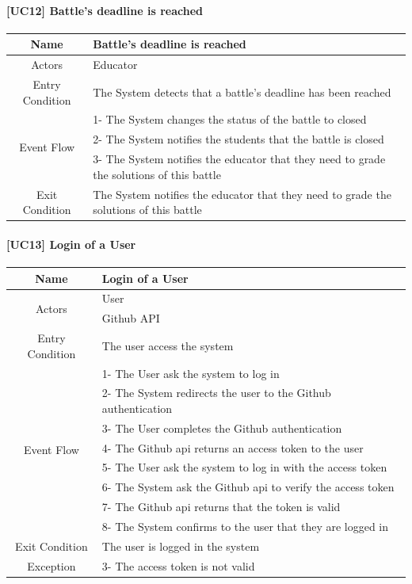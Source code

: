 \documentclass{article}
\begin{document}
\newpage
\paragraph{[UC12] Battle's deadline is reached}
\begin{center}
\begin{tabular}{|c|m{40em}|}
\hline
Name & Battle's deadline is reached\\
\hline
\multirow{1}{4em}{Actors}
& Educator\\
\hline
Entry Condition & The System detects that a battle's deadline has been reached\\
\hline
\multirow{3}{4em}{Event Flow}
&1- The System changes the status of the battle to closed\\
&2- The System notifies the students that the battle is closed\\
&3- The System notifies the educator that they need to grade the solutions of this battle\\
\hline
Exit Condition & The System notifies the educator that they need to grade the solutions of this battle\\
\hline
\end{tabular}
\end{center}

\paragraph{[UC13] Login of a User}
\begin{center}
\begin{tabular}{|c|m{40em}|}
\hline
Name & Login of a User\\
\hline
\multirow{2}{4em}{Actors}
& User\\
& Github API\\
\hline
Entry Condition & The user access the system\\
\hline
\multirow{8}{4em}{Event Flow}
& 1- The User ask the system to log in\\
& 2- The System redirects the user to the Github authentication\\
& 3- The User completes the Github authentication\\
& 4- The Github api returns an access token to the user\\
& 5- The User ask the system to log in with the access token\\
& 6- The System ask the Github api to verify the access token\\
& 7- The Github api returns that the token is valid\\
& 8- The System confirms to the user that they are logged in\\
\hline
Exit Condition & The user is logged in the system\\
\hline
Exception & 3- The access token is not valid\\
\hline
\end{tabular}
\end{center}
\newpage
\end{document}
